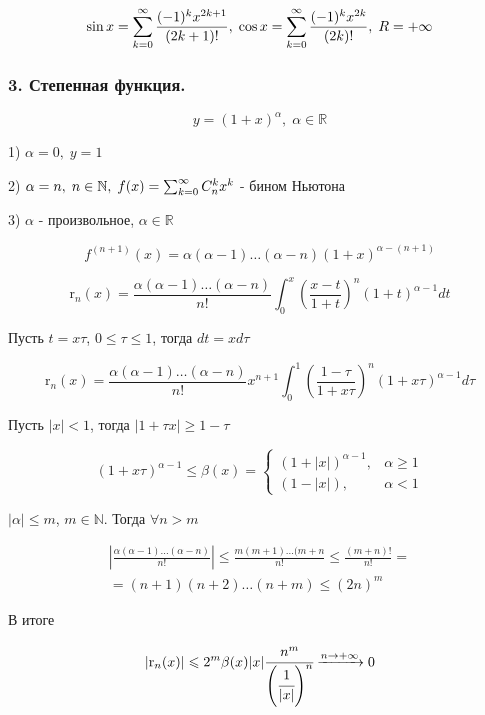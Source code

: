 $$ 
\sin x = \sum^{\infty}_{k = 0} \frac{(-1)^k x^{2k + 1}}{(2k + 1)!}, \; \cos x = \sum^{\infty}_{k = 0} \frac{(-1)^k x^{2k}}{(2k)!}, \;R = + \infty
$$


\subsubsection*{3. Степенная функция.}

$$y = (1 + x)^{\alpha}, \; \alpha \in \mathbb{R}$$


1) $\alpha = 0, \; y = 1$

2) $\alpha = n, \; n \in \mathbb{N}, \; f(x) = \sum^{\infty}_{k = 0} C^k_n x^k$ - бином Ньютона

3) $\alpha$ - произвольное, $\alpha \in \mathbb{R}$

$$ 
	f^{(n + 1)}(x) = \alpha (\alpha - 1) \ldots (\alpha - n) (1 + x)^{\alpha - (n + 1)} $$

$$
\mathrm{r}_n(x) = \frac{\alpha(\alpha - 1) \ldots (\alpha - n)}{n!} \int_0^x \left(\frac{x - t}{1 + t} \right)^n (1 + t)^{\alpha - 1} dt
$$

Пусть $t = x \tau$, $0 \leqslant \tau \leqslant 1$, тогда $dt = x d \tau$

$$
\mathrm{r}_n(x) =  \frac{\alpha(\alpha - 1) \ldots (\alpha - n)}{n!} x^{n + 1} \int_0^1 \left( \frac{1 - \tau}{1 + x\tau} \right)^n ( 1 + x \tau)^{\alpha - 1} d \tau
$$

Пусть $|x| < 1$, тогда $|1 + \tau x| \geqslant 1 - \tau$



\begin{equation*}
(1+x \tau)^{\alpha-1} \leqslant \beta(x)=
 \begin{cases}
   (1+|x|)^{\alpha-1}, & \alpha \geq 1 \\
   (1-|x|), & \alpha<1
 \end{cases}
\end{equation*}

$ | \alpha | \leqslant m $, $m \in \mathbb{N}$. Тогда $\forall n > m$

\begin{multline*}
\left| \frac{\alpha(\alpha - 1) \ldots (\alpha - n)}{n!} \right| \leqslant \frac{m (m + 1) \ldots (m + n}{n!} \leqslant \frac{(m + n)!}{n!} = \\
= (n + 1)(n + 2) \ldots (n + m)\leqslant (2n)^m
\end{multline*}

В итоге

$$ 
\left| \mathrm{r}_n (x) \right| \leqslant 2^m \beta (x) |x| \cfrac{n^m}{\left(\cfrac{1}{|x|}\right)^n} \xrightarrow{n \rightarrow + \infty} 0
$$

